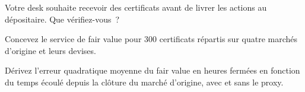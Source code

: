 \begin{interviewq}\label{iq:hf:depositary-receipts-and-dual-listings:4}
Votre desk souhaite recevoir des certificats avant de livrer les actions au dépositaire. Que vérifiez-vous~?
\end{interviewq}

\begin{interviewq}\label{iq:hf:depositary-receipts-and-dual-listings:5}
Concevez le service de fair value pour 300 certificats répartis sur quatre marchés d'origine et leurs devises.
\end{interviewq}

\begin{interviewq}\label{iq:hf:depositary-receipts-and-dual-listings:6}
Dérivez l'erreur quadratique moyenne du fair value en heures fermées en fonction du temps écoulé depuis la clôture du marché d'origine, avec et sans le proxy.
\end{interviewq}
